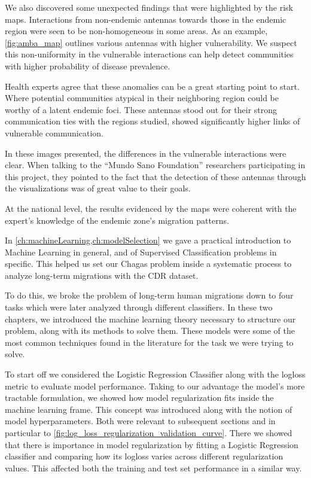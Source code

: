 We also discovered some unexpected findings that were highlighted by the risk maps.
Interactions from non-endemic antennas towards those in the endemic region were seen to be non-homogeneous in some areas.
As an example, \cref{fig:amba_map} outlines various antennas with higher vulnerability.
We suspect this non-uniformity in the vulnerable interactions can help detect communities with higher probability of disease prevalence.

Health experts agree that these anomalies can be a great starting point to start.
Where potential communities atypical in their neighboring region could be worthy of a latent endemic foci.
These antennas stood out for their strong communication ties with the regions studied, showed significantly higher links of vulnerable communication.

In these images presented, the differences in the vulnerable interactions were clear.
When talking to the ``Mundo Sano Foundation'' researchers participating in this project, they pointed to the fact that the detection of these antennas through the visualizations was of great value to their goals.


At the national level, the results evidenced by the maps were coherent with the expert's knowledge of the endemic zone's migration patterns.



In \cref{ch:machineLearning,ch:modelSelection} we gave a practical introduction to Machine Learning in general, and of Supervised Classification problems in specific.
This helped us set our Chagas problem inside a systematic process to analyze long-term migrations with the CDR dataset.

To do this, we broke the problem of long-term human migrations down to four tasks which were later analyzed through different classifiers.
In these two chapters, we introduced the machine learning theory necessary to structure our problem, along with its methods to solve them.
These models were some of the most common techniques found in the literature for the task we were trying to solve.

To start off we considered the Logistic Regression Classifier along with the logloss metric to evaluate model performance.
Taking to our advantage the model's more tractable formulation, we showed how model regularization fits inside the machine learning frame.
This concept was introduced along with the notion of model hyperparameters.
Both were relevant to subsequent sections and in particular to \cref{fig:log_loss_regularization_validation_curve}.
There we showed that there is importance in model regularization by fitting a Logistic Regression classifier and comparing how its logloss varies across different regularization values.
This affected both the training and test set performance in a similar way.


